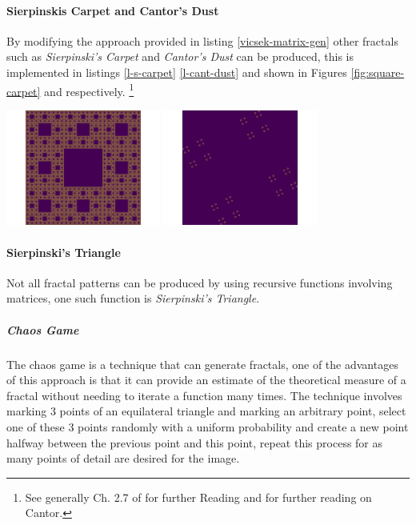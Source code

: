 \documentclass[a4paper,11pt,twoside]{article}
\begin{document}
\paragraph{Sierpinskis Carpet and Cantor's Dust}
\label{sec:org8303fb0}
By modifying the approach provided in listing \ref{vicsek-matrix-gen} other fractals
such as \emph{Sierpinski's Carpet} and \emph{Cantor's Dust} can be produced, this is
implemented in listings \ref{l-s-carpet} \ref{l-cant-dust} and shown in Figures
\ref{fig:square-carpet} and respectively. \footnote{See generally Ch. 2.7 of \cite[\S 2.7]{peitgenChaosFractalsNew2004} for further Reading and \cite[p. 79]{mandelbrotFractalGeometryNature1982} for further reading on Cantor.}


\label{fig:square-carpet}
\begin{center}
\includegraphics[width=0.38\textwidth]{media/sierpinsky_carpet.png}
\includegraphics[width=0.38\textwidth]{media/Cantor_Dust_gen.png}
\end{center}



\paragraph{Sierpinski's Triangle}
\label{sec:org7e3ef29}
Not all fractal patterns can be produced by using recursive functions involving matrices, one such function is \emph{Sierpinski's Triangle}.
\subparagraph{Chaos Game}
\label{sec:orga31b460}
The chaos game is a technique that can generate fractals, one of the advantages of this approach is that it can provide an estimate of the theoretical measure of a fractal without needing to iterate a function many times. The technique involves marking 3 points of an equilateral triangle and marking an arbitrary point, select one of these 3 points randomly with a uniform probability and create a new point halfway between the previous point and this point, repeat this process for as many points of detail are desired for the image.
\end{document}
